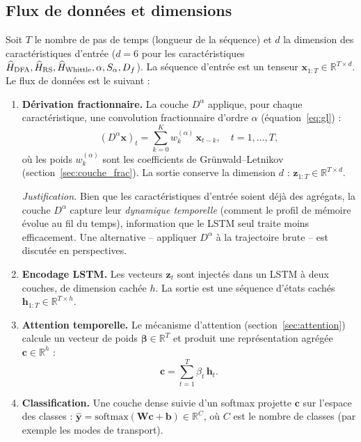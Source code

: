 \subsection{Flux de données et dimensions}
Soit $T$ le nombre de pas de temps (longueur de la séquence) et $d$ la dimension des caractéristiques d'entrée ($d = 6$ pour les caractéristiques $\widehat{H}_{\text{DFA}}, \widehat{H}_{\text{RS}}, \widehat{H}_{\text{Whittle}}, \alpha, S_\alpha, D_f$). La séquence d'entrée est un tenseur $\mathbf{x}_{1:T} \in \mathbb{R}^{T \times d}$. Le flux de données est le suivant :

\begin{enumerate}[label=(\arabic*)]
\item \textbf{Dérivation fractionnaire.} La couche $D^\alpha$ applique, pour chaque caractéristique, une convolution fractionnaire d'ordre $\alpha$ (équation~\ref{eq:gl}) :
\begin{equation}
(D^\alpha \mathbf{x})_t = \sum_{k=0}^{K} w_k^{(\alpha)} \, \mathbf{x}_{t-k}, \quad t = 1, \dots, T,
\end{equation}
où les poids $w_k^{(\alpha)}$ sont les coefficients de Grünwald--Letnikov (section~\ref{sec:couche_frac}). La sortie conserve la dimension $d$ : $\mathbf{z}_{1:T} \in \mathbb{R}^{T \times d}$.

\textit{Justification.} Bien que les caractéristiques d'entrée soient déjà des agrégats, la couche $D^\alpha$ capture leur \emph{dynamique temporelle} (comment le profil de mémoire évolue au fil du temps), information que le LSTM seul traite moins efficacement. Une alternative -- appliquer $D^\alpha$ à la trajectoire brute -- est discutée en perspectives.
\item \textbf{Encodage LSTM.} Les vecteurs $\mathbf{z}_t$ sont injectés dans un LSTM à deux couches, de dimension cachée $h$. La sortie est une séquence d'états cachés $\mathbf{h}_{1:T} \in \mathbb{R}^{T \times h}$.
\item \textbf{Attention temporelle.} Le mécanisme d'attention (section~\ref{sec:attention}) calcule un vecteur de poids $\boldsymbol{\beta} \in \mathbb{R}^{T}$ et produit une représentation agrégée $\mathbf{c} \in \mathbb{R}^{h}$ :
\begin{equation}
\mathbf{c} = \sum_{t=1}^{T} \beta_t \, \mathbf{h}_t.
\end{equation}
\item \textbf{Classification.} Une couche dense suivie d'un softmax projette $\mathbf{c}$ sur l'espace des classes : $\hat{\mathbf{y}} = \mathrm{softmax}(\mathbf{W} \mathbf{c} + \mathbf{b}) \in \mathbb{R}^{C}$, où $C$ est le nombre de classes (par exemple les modes de transport).
\end{enumerate}

